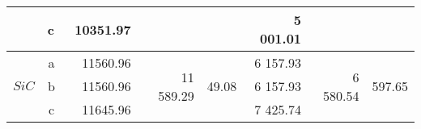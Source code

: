 \begin{table}[H]
{\begin{tabular}{|c|c|r|r|r|r|r|r|}
                                                                                                     & c~       & 10351.97                                                                      &                                                                                     &                                                                                       & 5 001.01                                                                      &                                                                                     &                                                                                       \\ \hline
    \multirow{3}{*}{$SiC$}                                                                           & a~       & 11560.96                                                                      & \multirow{3}{*}{11 589.29}                                                          & \multirow{3}{*}{49.08}                                                                & 6 157.93                                                                      & \multirow{3}{*}{6 580.54}                                                           & \multirow{3}{*}{597.65}                                                               \\ \cline{2-3} \cline{6-6}
                                                                                                     & b~       & 11560.96                                                                      &                                                                                     &                                                                                       & 6 157.93                                                                      &                                                                                     &                                                                                       \\ \cline{2-3} \cline{6-6}
                                                                                                     & c~       & 11645.96                                                                      &                                                                                     &                                                                                       & 7 425.74                                                                      &                                                                                     &                                                                                       \\ \hline

\end{tabular}}
\end{table}

